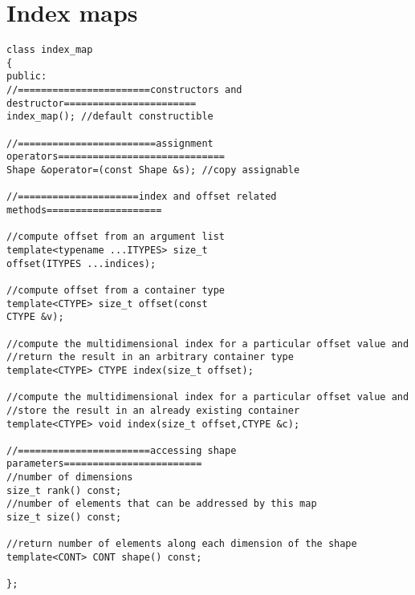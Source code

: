 
\section{Index maps}

\begin{verbatim}
class index_map
{
public:
//=======================constructors and destructor=======================
index_map(); //default constructible

//========================assignment operators=============================
Shape &operator=(const Shape &s); //copy assignable 

//=====================index and offset related methods====================

//compute offset from an argument list
template<typename ...ITYPES> size_t
offset(ITYPES ...indices);

//compute offset from a container type
template<CTYPE> size_t offset(const
CTYPE &v);

//compute the multidimensional index for a particular offset value and 
//return the result in an arbitrary container type
template<CTYPE> CTYPE index(size_t offset);

//compute the multidimensional index for a particular offset value and 
//store the result in an already existing container
template<CTYPE> void index(size_t offset,CTYPE &c);

//=======================accessing shape parameters========================
//number of dimensions
size_t rank() const; 
//number of elements that can be addressed by this map
size_t size() const; 

//return number of elements along each dimension of the shape
template<CONT> CONT shape() const;

};
\end{verbatim}
